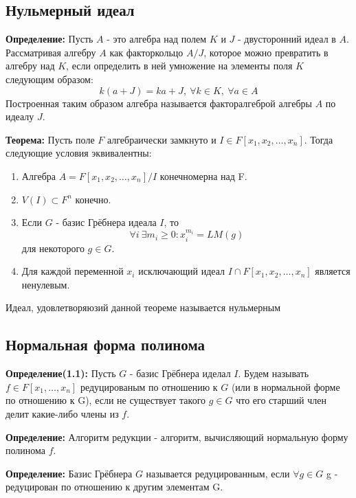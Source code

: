 \documentclass{article}
\begin{document}
    \newpage
    \subsection{Нульмерный идеал}
    \textbf{Определение:} Пусть $A$  - это алгебра над полем $K$ и $J$ - двусторонний идеал в $A$. Рассматривая
    алгебру $A$ как факторкольцо $A/J$, которое можно превратить в алгебру над $K$, если определить в ней умножение
    на элементы поля $K$ следующим образом:
    $$k(a+J) = ka+J, \: \forall k \in K,\: \forall a \in A$$
    Построенная таким образом алгебра называется факторалгеброй алгебры $A$ по идеалу $J$.

    \textbf{Теорема:} Пусть поле $F$ алгебраически замкнуто и $I\in F[x_1, x_2,\ldots, x_n]$.
       Тогда следующие условия эквивалентны:
        
        \begin{enumerate}
            \item Алгебра $A=F[x_1, x_2,\ldots, x_n]/I$ конечномерна над F.
            \item $V(I) \subset F^n$ конечно.
            \item Если $G$ - базис Грёбнера идеала $I$, то $$\forall i \: \exists m_i \geq 0 : x_i^{m_i} = LM(g)$$ для некоторого $g \in G$.
            \item Для каждой переменной $x_i$ исключающий идеал $I \cap F[x_1, x_2,\ldots, x_n]$ является ненулевым.
        \end{enumerate}

      Идеал, удовлетворяюзий данной теореме называется нульмерным

    \newpage

    \subsection{Нормальная форма полинома}

    
    \textbf{Определение(1.1):} Пусть $G$ - базис Грёбнера иделал $I$.
    Будем называть $f \in F[x_1,\ldots,x_n]$ редуцированым по отношению к $G$ (или в нормальной форме по отношению к G), если 
    не существует такого $g \in G$ что его старший член делит какие-либо члены из $f$.
    
    \textbf{Определение:} Алгоритм редукции - алгоритм, вычисляющий нормальную форму полинома $f$.
    
    \textbf{Определение:} Базис Грёбнера $G$ называется редуцированным, если $\forall g \in G$ g - редуцирован по отношению к другим элементам G.
               
\end{document}
